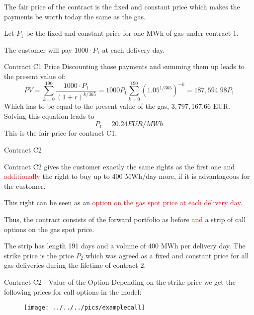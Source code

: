 



	The fair price of the contract is the fixed and constant price which makes the payments be worth today the same as the gas.


	Let $P_1$ be the fixed and constant price for one MWh of gas under contract 1.


	The customer will pay $1000 \cdot P_1$ at each delivery day.





{Contract C1 Price}
Discounting those payments and summing them up leads to the present value of:
$$
	PV = \sum_{k=0}^{190}{\frac{1000 \cdot P_1}{(1 + r)^{k/365}}} = 1000 P_1 \sum_{k=0}^{190} (1.05^{1/365})^{-k} = 187,594.98 P_1
$$
Which has to be equal to the present value of the gas, $3,797,167.66$ EUR. Solving this equation leads to
$$
	P_1 = 20.24 EUR/MWh
$$
This is the fair price for contract C1.


{Contract C2}






	Contract C2 gives the customer exactly the same rights as the first one and \textcolor{red}{additionally} the right to buy up to 400 MWh/day more, if it is advantageous for the customer.


	This right can be seen as an \textcolor{red}{option on the gas spot price at each delivery day}.


	Thus, the contract consists of the forward portfolio as before \textcolor{red}{and} a strip of call options on the gas spot price.


	The strip has length 191 days and a volume of 400 MWh per delivery day. The strike price is the price $P_2$ which was agreed as a fixed and constant price for all gas deliveries during the lifetime of contract 2.





{Contract C2 - Value of the Option}
Depending on the strike price we get the following prices for call options in the model:
\begin{figure}
	\centering
		\texttt{[image: ../../../pics/examplecall]}
	\label{fig:examplecall}
\end{figure}

